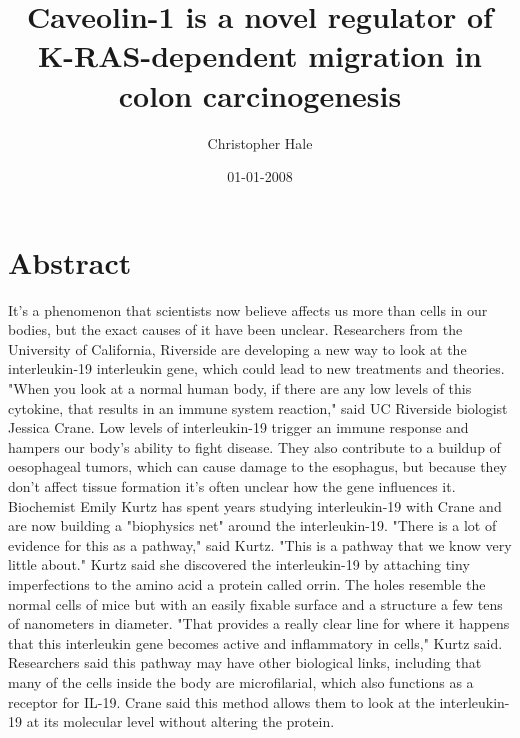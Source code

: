 \documentclass{article}%
\title{Caveolin{-}1 is a novel regulator of K{-}RAS{-}dependent migration in colon carcinogenesis}%
\author{Christopher Hale}%
\affil{Department of Oral Biology and Pathology, School of Dental Medicine, Stony Brook University, Stony Brook, New York, United States of America}%
\date{01{-}01{-}2008}%
\begin{document}
%
\normalsize%
\maketitle%
\section{Abstract}%
\label{sec:Abstract}%
It's a phenomenon that scientists now believe affects us more than cells in our bodies, but the exact causes of it have been unclear.\newline%
Researchers from the University of California, Riverside are developing a new way to look at the interleukin{-}19 interleukin gene, which could lead to new treatments and theories.\newline%
"When you look at a normal human body, if there are any low levels of this cytokine, that results in an immune system reaction," said UC Riverside biologist Jessica Crane.\newline%
Low levels of interleukin{-}19 trigger an immune response and hampers our body's ability to fight disease. They also contribute to a buildup of oesophageal tumors, which can cause damage to the esophagus, but because they don't affect tissue formation it's often unclear how the gene influences it.\newline%
Biochemist Emily Kurtz has spent years studying interleukin{-}19 with Crane and are now building a "biophysics net" around the interleukin{-}19.\newline%
"There is a lot of evidence for this as a pathway," said Kurtz. "This is a pathway that we know very little about."\newline%
Kurtz said she discovered the interleukin{-}19 by attaching tiny imperfections to the amino acid a protein called orrin. The holes resemble the normal cells of mice but with an easily fixable surface and a structure a few tens of nanometers in diameter.\newline%
"That provides a really clear line for where it happens that this interleukin gene becomes active and inflammatory in cells," Kurtz said.\newline%
Researchers said this pathway may have other biological links, including that many of the cells inside the body are microfilarial, which also functions as a receptor for IL{-}19.\newline%
Crane said this method allows them to look at the interleukin{-}19 at its molecular level without altering the protein.\newline%
\end{document}
